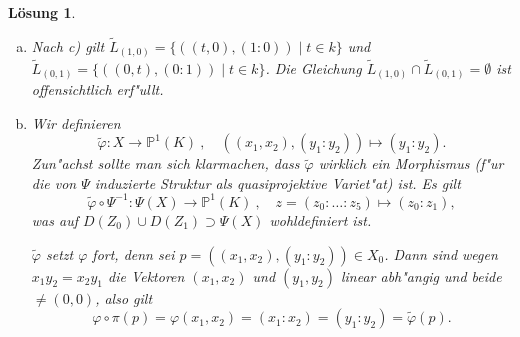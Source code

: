 \documentclass[a4paper, 12pt, numbers=noendperiod, chapterprefix=true, headsepline]{scrbook}
\theoremstyle{break}
\newtheorem{Loes}{L\"osung}
\theoremstyle{nonumberbreak}
\theoremstyle{nonumberplain}
\newcommand{\quot}[1]{\textrm{\glqq}{#1}\textrm{\grqq}}
\DeclareMathOperator{\Bild}{Bild}
\newcommand{\A}{\mathbb{A}}
\newcommand{\IP}{\mathbb{P}}%
\begin{document}
\begin{Loes}
\begin{enumerate}[a)]
	\emph{Behauptung}: $\Bild(\Psi \circ h) = \Psi(X) \cap V(v_1Z_1-v_2Z_0)$ (daraus folgt dann insbesondere, dass $\Bild (\Psi \circ h)$ abgeschlossen ist).
 
	\emph{Beweis der Behauptung}:  Die Inklusion \quot{$\subseteq$} ist klar. Sei umgekehrt $z \in \Psi(X) \cap V(v_1Z_1-v_2Z_0)$. Dann sind $(v_1, v_2)$ und $(z_0, z_1)$ linear abh"angig und wegen a) gilt $z = (z_0:z_1:\tau z_0^2 : \tau z_0z_1: \tau z_0z_1:\tau z_1^2)$ mit $\tau \in k$ geeignet. Damit liegt $z$ in $\Bild(\Psi \circ h)$.
 
	Es gilt $\Psi(\pi^{-1}(L_v\setminus \{(0,0)\})) = (\Psi \circ \sigma)(L_v\setminus \{(0,0)\}) = \{(v_0:v_1:tv_0^2:t v_0v_1:tv_0v_1:tv_1^2) \mid t \in k\}$. Somit ist $\Bild(\Psi \circ h) = \Psi(\pi^{-1}(L_v\setminus \{(0,0)\})) \cup \{(v_0:v_1:0:0:0:0)\}$ und weil $\Bild(\Psi \circ h)$ irreduzibel ist und $\{(v_0:v_1:0:0:0:0)\}$ abgeschlossen, muss $\Psi(\pi^{-1}(L_v\setminus \{(0,0)\}))$ offen sein. Da $\Bild(\Psi \circ h)$ abgeschlossen ist folgt $\Psi(\widetilde{L_v}) = \Bild(\psi \circ h) = \Psi(H)$.
 
	Es bleibt zu folgern, dass f"ur alle $p \in E = \pi^{-1}((0,0))$ ein $M \subseteq X_0$ existiert mit $p \in \overline M$:\\
	Sei $((0,0),[v]) \in E$, also $v \in \A^2(k) \setminus \{(0,0)\}$. Dann ist $\widetilde{L_v} \cap E = \{(v_0\colon v_1 \colon 0 \colon 0 \colon 0 \colon 0)\} \stackrel{\Psi^{-1}}{\rightarrow} \{((0,0),[v])\}$, also ist $((0,0),[v])$ im Abschluss von $\pi^{-1}(L_v \setminus\{(0,0)\})$ enthalten und $\pi^{-1}(L_v \setminus\{(0,0)\}) \subseteq X_0$. 
\item
	Nach c) gilt $\widetilde{L}_{(1,0)} = \{((t,0),(1:0)) \mid t \in k\}$ und $\widetilde{L}_{(0,1)} = \{((0,t),(0:1)) \mid t \in k\}$. Die Gleichung $\widetilde{L}_{(1,0)} \cap \widetilde{L}_{(0,1)} = \emptyset$ ist offensichtlich erf"ullt.
\item
	Wir definieren
		\[\tilde\varphi: X\to \IP^1(K)\ ,\quad ((x_1,x_2),(y_1:y_2)) \mapsto (y_1:y_2).\]
	Zun"achst sollte man sich klarmachen, dass $\tilde\varphi$ wirklich ein Morphismus (f"ur die von $\Psi$ induzierte Struktur als quasiprojektive Variet"at) ist. Es gilt
		\[\tilde\varphi \circ \Psi^{-1}: \Psi(X)\to\IP^1(K)\ ,\quad z = (z_0:\ldots:z_5)\mapsto (z_0:z_1),\]
	was auf $D(Z_0)\cup D(Z_1)\supset \Psi(X)$ wohldefiniert ist.
	
	$\tilde\varphi$ setzt $\varphi$ fort, denn sei $p = ((x_1,x_2), (y_1:y_2))\in X_0$. Dann sind wegen $x_1y_2 = x_2y_1$ die Vektoren $(x_1,x_2)$ und $(y_1,y_2)$ linear abh"angig und beide $\neq (0,0)$, also gilt
		\[\varphi\circ \pi(p) = \varphi(x_1,x_2) = (x_1:x_2) = (y_1:y_2) = \tilde\varphi(p).\]
\end{enumerate}\end{Loes}
\end{document}
